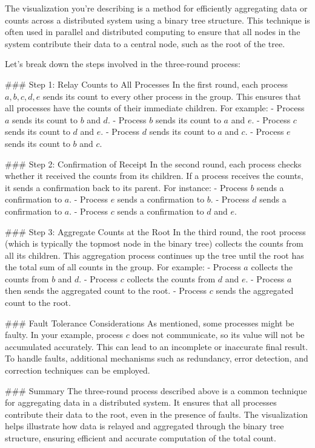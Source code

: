 The visualization you're describing is a method for efficiently aggregating data or counts across a distributed system using a binary tree structure. This technique is often used in parallel and distributed computing to ensure that all nodes in the system contribute their data to a central node, such as the root of the tree.

Let's break down the steps involved in the three-round process:

### Step 1: Relay Counts to All Processes
In the first round, each process \(a, b, c, d, e\) sends its count to every other process in the group. This ensures that all processes have the counts of their immediate children. For example:
- Process \(a\) sends its count to \(b\) and \(d\).
- Process \(b\) sends its count to \(a\) and \(e\).
- Process \(c\) sends its count to \(d\) and \(e\).
- Process \(d\) sends its count to \(a\) and \(c\).
- Process \(e\) sends its count to \(b\) and \(c\).

### Step 2: Confirmation of Receipt
In the second round, each process checks whether it received the counts from its children. If a process receives the counts, it sends a confirmation back to its parent. For instance:
- Process \(b\) sends a confirmation to \(a\).
- Process \(e\) sends a confirmation to \(b\).
- Process \(d\) sends a confirmation to \(a\).
- Process \(c\) sends a confirmation to \(d\) and \(e\).

### Step 3: Aggregate Counts at the Root
In the third round, the root process (which is typically the topmost node in the binary tree) collects the counts from all its children. This aggregation process continues up the tree until the root has the total sum of all counts in the group. For example:
- Process \(a\) collects the counts from \(b\) and \(d\).
- Process \(c\) collects the counts from \(d\) and \(e\).
- Process \(a\) then sends the aggregated count to the root.
- Process \(c\) sends the aggregated count to the root.

### Fault Tolerance Considerations
As mentioned, some processes might be faulty. In your example, process \(c\) does not communicate, so its value will not be accumulated accurately. This can lead to an incomplete or inaccurate final result. To handle faults, additional mechanisms such as redundancy, error detection, and correction techniques can be employed.

### Summary
The three-round process described above is a common technique for aggregating data in a distributed system. It ensures that all processes contribute their data to the root, even in the presence of faults. The visualization helps illustrate how data is relayed and aggregated through the binary tree structure, ensuring efficient and accurate computation of the total count.
